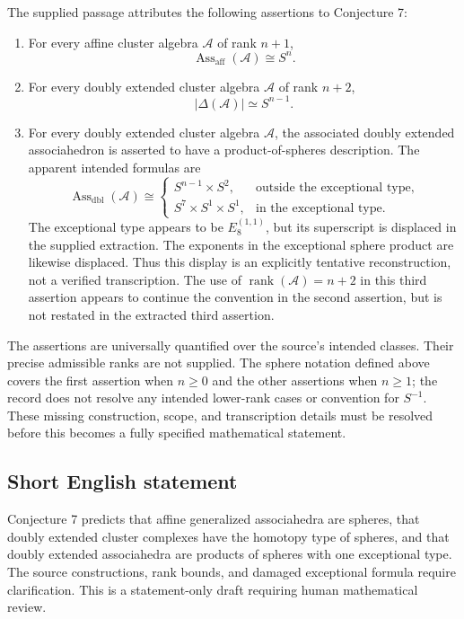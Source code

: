 \documentclass[11pt]{article}
\begin{document}
The supplied passage attributes the following assertions to Conjecture 7:
\begin{enumerate}
\item For every affine cluster algebra \(\mathcal A\) of rank \(n+1\),
\[
\operatorname{Ass}_{\mathrm{aff}}(\mathcal A)\cong S^n.
\]
\item For every doubly extended cluster algebra \(\mathcal A\) of rank \(n+2\),
\[
|\Delta(\mathcal A)|\simeq S^{n-1}.
\]
\item For every doubly extended cluster algebra \(\mathcal A\), the associated doubly extended associahedron is asserted to have a product-of-spheres description. The apparent intended formulas are
\[
\operatorname{Ass}_{\mathrm{dbl}}(\mathcal A)\cong
\begin{cases}
S^{n-1}\times S^2,&\text{outside the exceptional type},\\
S^7\times S^1\times S^1,&\text{in the exceptional type}.
\end{cases}
\]
The exceptional type appears to be \(E_8^{(1,1)}\), but its superscript is displaced in the supplied extraction. The exponents in the exceptional sphere product are likewise displaced. Thus this display is an explicitly tentative reconstruction, not a verified transcription. The use of \(\operatorname{rank}(\mathcal A)=n+2\) in this third assertion appears to continue the convention in the second assertion, but is not restated in the extracted third assertion.
\end{enumerate}
The assertions are universally quantified over the source's intended classes. Their precise admissible ranks are not supplied. The sphere notation defined above covers the first assertion when \(n\geq0\) and the other assertions when \(n\geq1\); the record does not resolve any intended lower-rank cases or convention for \(S^{-1}\). These missing construction, scope, and transcription details must be resolved before this becomes a fully specified mathematical statement.
\subsection{Short English statement}
Conjecture 7 predicts that affine generalized associahedra are spheres, that doubly extended cluster complexes have the homotopy type of spheres, and that doubly extended associahedra are products of spheres with one exceptional type. The source constructions, rank bounds, and damaged exceptional formula require clarification. This is a statement-only draft requiring human mathematical review.
\end{document}
